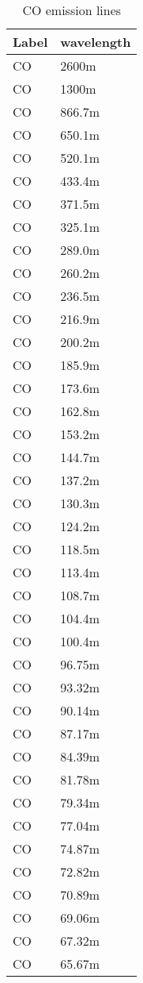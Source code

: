 \begin{table}
\centering
\caption{\label{tab:COLines}CO emission lines}
\begin{tabular}{ll}
\hline
Label & wavelength \\
\hline
CO   & 2600m \\
CO   & 1300m \\
CO   & 866.7m \\
CO  	& 650.1m \\
CO  	& 520.1m \\
CO  	& 433.4m \\
CO  	& 371.5m \\
CO  	& 325.1m \\
CO  	& 289.0m \\
CO  	& 260.2m \\
CO  	& 236.5m \\
CO  	& 216.9m \\
CO  	& 200.2m \\
CO  	& 185.9m \\
CO  	& 173.6m \\
CO  	& 162.8m \\
CO  	& 153.2m \\
CO  	& 144.7m \\
CO  	& 137.2m \\
CO  	& 130.3m \\
CO  	& 124.2m \\
CO  	& 118.5m \\
CO  	& 113.4m \\
CO  	& 108.7m \\
CO  	& 104.4m \\
CO  	& 100.4m \\
CO  	& 96.75m \\
CO  	& 93.32m \\
CO  	& 90.14m \\
CO  	& 87.17m \\
CO  	& 84.39m \\
CO  	& 81.78m \\
CO  	& 79.34m \\
CO  	& 77.04m \\
CO  	& 74.87m \\
CO  	& 72.82m \\
CO  	& 70.89m \\
CO  	& 69.06m \\
CO  	& 67.32m \\
CO  	& 65.67m \\
\hline
\end{tabular}
\end{table}

